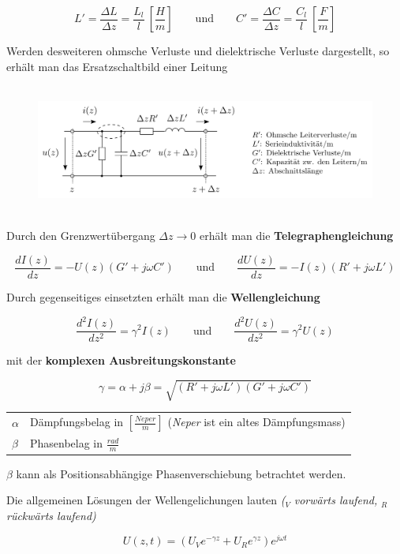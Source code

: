 \documentclass[
  10pt,
  a4paper,
  german]{article}
\makeatletter
\numberwithin{equation}{section}
\newenvironment{conditions}
  {\par\vspace{\abovedisplayskip}\noindent\begin{tabular}{>{$}l<{$} @{${}:{}$} l}}
  {\end{tabular}\par\vspace{\belowdisplayskip}}
\makeatother
\begin{document}
\[
L'=\frac{\Delta L}{\Delta z}=\frac{L_l}{l}\ \left[\frac{H}{m}\right]\qquad\text{und}\qquad C'=\frac{\Delta C}{\Delta z}=\frac{C_l}{l}\ \left[\frac{F}{m}\right]
\]

Werden desweiteren ohmsche Verluste und dielektrische Verluste
dargestellt, so erhält man das Ersatzschaltbild einer Leitung

\begin{figure}[H]

{\centering \includegraphics[width=15cm,height=4.3cm]{images/03_Leitung.png}

}

\end{figure}

Durch den Grenzwertübergang \(\Delta z\rightarrow 0\) erhält man die
\textbf{Telegraphengleichung}

\[
\frac{dI(z)}{dz}=-U(z)(G'+j\omega C')\qquad\text{und}\qquad\frac{dU(z)}{dz}=-I(z)(R'+j\omega L')
\]

Durch gegenseitiges einsetzten erhält man die \textbf{Wellengleichung}

\[
\frac{d^2I(z)}{dz^2}=\gamma^2I(z)\qquad\text{und}\qquad\frac{d^2U(z)}{dz^2}=\gamma^2U(z)
\]

mit der \textbf{komplexen Ausbreitungskonstante}

\[
\gamma=\alpha+j\beta=\sqrt{(R'+j\omega L')(G'+j\omega C')}
\]

\begin{conditions}
  \alpha & Dämpfungsbelag in $\left[\tfrac{Neper}{m}\right]$ (\textit{Neper} ist ein altes Dämpfungsmass) \\
  \beta & Phasenbelag in $\tfrac{rad}{m}$
\end{conditions}

\(\beta\) kann als Positionsabhängige Phasenverschiebung betrachtet
werden.

Die allgemeinen Lösungen der Wellengelichungen lauten \emph{(}\(_V\)
\emph{vorwärts laufend,} \(_R\) \emph{rückwärts laufend)}

\[
U(z,t)=(U_Ve^{-\gamma z}+U_Re^{\gamma z})e^{j\omega t}
\]
\end{document}
